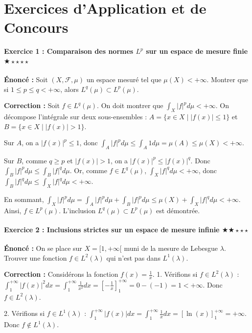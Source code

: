 \documentclass[11pt,a4paper]{article}
\begin{document}
\part{Exercices d'Application et de Concours}
\subsection*{Exercice 1 : Comparaison des normes $L^p$ sur un espace de mesure finie \quad $\bigstar\star\star\star\star$}

\textbf{Énoncé :}
Soit $(X, \mathcal{F}, \mu)$ un espace mesuré tel que $\mu(X) < +\infty$.
Montrer que si $1 \le p \le q < +\infty$, alors $L^q(\mu) \subset L^p(\mu)$.

\textbf{Correction :}
Soit $f \in L^q(\mu)$. On doit montrer que $\int_X |f|^p d\mu < +\infty$.
On décompose l'intégrale sur deux sous-ensembles :
$A = \{x \in X \mid |f(x)| \le 1\}$ et $B = \{x \in X \mid |f(x)| > 1\}$.

Sur $A$, on a $|f(x)|^p \le 1$, donc $\int_A |f|^p d\mu \le \int_A 1 d\mu = \mu(A) \le \mu(X) < +\infty$.

Sur $B$, comme $q \ge p$ et $|f(x)| > 1$, on a $|f(x)|^p \le |f(x)|^q$.
Donc $\int_B |f|^p d\mu \le \int_B |f|^q d\mu$.
Or, comme $f \in L^q(\mu)$, $\int_X |f|^q d\mu < +\infty$, donc $\int_B |f|^q d\mu \le \int_X |f|^q d\mu < +\infty$.

En sommant, $\int_X |f|^p d\mu = \int_A |f|^p d\mu + \int_B |f|^p d\mu \le \mu(X) + \int_X |f|^q d\mu < +\infty$.
Ainsi, $f \in L^p(\mu)$. L'inclusion $L^q(\mu) \subset L^p(\mu)$ est démontrée.


\subsection*{Exercice 2 : Inclusions strictes sur un espace de mesure infinie \quad $\bigstar\bigstar\star\star\star$}

\textbf{Énoncé :}
On se place sur $X = [1, +\infty[$ muni de la mesure de Lebesgue $\lambda$.
Trouver une fonction $f \in L^2(\lambda)$ qui n'est pas dans $L^1(\lambda)$.

\textbf{Correction :}
Considérons la fonction $f(x) = \frac{1}{x}$.
1. Vérifions si $f \in L^2(\lambda)$ :
$\int_1^{+\infty} |f(x)|^2 dx = \int_1^{+\infty} \frac{1}{x^2} dx = \left[ -\frac{1}{x} \right]_1^{+\infty} = 0 - (-1) = 1 < +\infty$.
Donc $f \in L^2(\lambda)$.

2. Vérifions si $f \in L^1(\lambda)$ :
$\int_1^{+\infty} |f(x)| dx = \int_1^{+\infty} \frac{1}{x} dx = \left[ \ln(x) \right]_1^{+\infty} = +\infty$.
Donc $f \notin L^1(\lambda)$.
\end{document}
